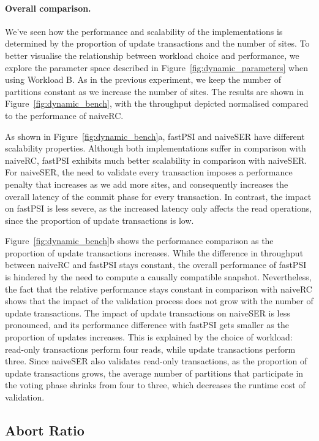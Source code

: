 \paragraph{Overall comparison.} We've seen how the performance and scalability of the implementations is determined by the proportion of update transactions and the number of sites. To better visualise the relationship between workload choice and performance, we explore the parameter space described in Figure~\ref{fig:dynamic_parameters} when using Workload B. As in the previous experiment, we keep the number of partitions constant as we increase the number of sites. The results are shown in Figure~\ref{fig:dynamic_bench}, with the throughput depicted normalised compared to the performance of naiveRC.

As shown in Figure~\ref{fig:dynamic_bench}a, fastPSI and naiveSER have different scalability properties. Although both implementations suffer in comparison with naiveRC, fastPSI exhibits much better scalability in comparison with naiveSER. For naiveSER, the need to validate every transaction imposes a performance penalty that increases as we add more sites, and consequently increases the overall latency of the commit phase for every transaction. In contrast, the impact on fastPSI is less severe, as the increased latency only affects the read operations, since the proportion of update transactions is low.

Figure~\ref{fig:dynamic_bench}b shows the performance comparison as the proportion of update transactions increases. While the difference in throughput between naiveRC and fastPSI stays constant, the overall performance of fastPSI is hindered by the need to compute a causally compatible snapshot. Nevertheless, the fact that the relative performance stays constant in comparison with naiveRC shows that the impact of the validation process does not grow with the number of update transactions. The impact of update transactions on naiveSER is less pronounced, and its performance difference with fastPSI gets smaller as the proportion of updates increases. This is explained by the choice of workload: read-only transactions perform four reads, while update transactions perform three. Since naiveSER also validates read-only transactions, as the proportion of update transactions grows, the average number of partitions that participate in the voting phase shrinks from four to three, which decreases the runtime cost of validation.

\subsection{Abort Ratio}
\label{subsect:abort_ratio}

